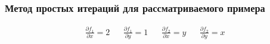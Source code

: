 \subsubsection{Метод простых итераций для рассматриваемого примера}
\begin{align}
	\frac{\partial f_1}{\partial x} = 2 &  &
	\frac{\partial f_1}{\partial y} = 1 &  &
	\frac{\partial f_2}{\partial x} = y &  &
	\frac{\partial f_2}{\partial y} = x
\end{align}
